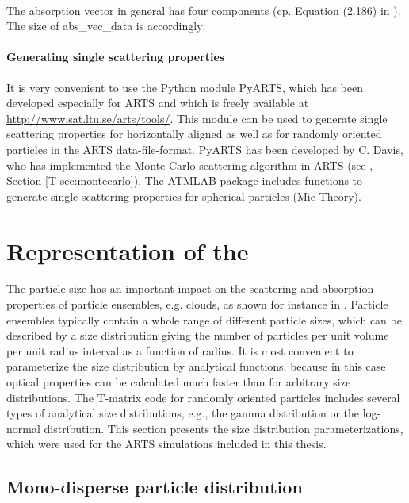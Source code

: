 \\
The absorption vector in general has four components (cp. Equation
(2.186) in \citet{Mishchenko:02}). The size of abs\_vec\_data is
accordingly: 


\paragraph{Generating single scattering properties}
It is very convenient to use the Python module PyARTS, which has been
developed especially for ARTS and which is freely available at
\href{http://www.sat.ltu.se/arts/tools/}
{\url{http://www.sat.ltu.se/arts/tools/}}. This
module can be used to generate single scattering properties for
horizontally aligned as well as for randomly oriented particles in the
ARTS data-file-format. PyARTS has been developed by C. Davis, who has
implemented the Monte Carlo scattering algorithm in ARTS (see
\theory, Section \ref{T-sec:montecarlo}).
The ATMLAB package includes functions to generate single scattering
properties for spherical particles (Mie-Theory). 


\section[Particle size distributions]
{Representation of the }
\label{sec:clouds:size_distr}

The particle size has an important impact on the scattering and
absorption properties of particle ensembles, e.g. clouds, as shown for instance
in \citep{emde04:_doit_jgr}.  Particle ensembles typically contain a whole range
of different particle sizes, which can be described by a size
distribution giving the number of particles per unit volume per unit
radius interval as a function of radius.  It is most convenient to
parameterize the size distribution by analytical functions, because in
this case optical properties can be calculated much faster than for
arbitrary size distributions. The T-matrix code for randomly oriented
particles includes several types of analytical size distributions,
e.g., the gamma distribution or the log-normal distribution.  This
section presents the size distribution parameterizations, which were
used for the ARTS simulations included in this thesis.

\subsection{Mono-disperse particle distribution}

